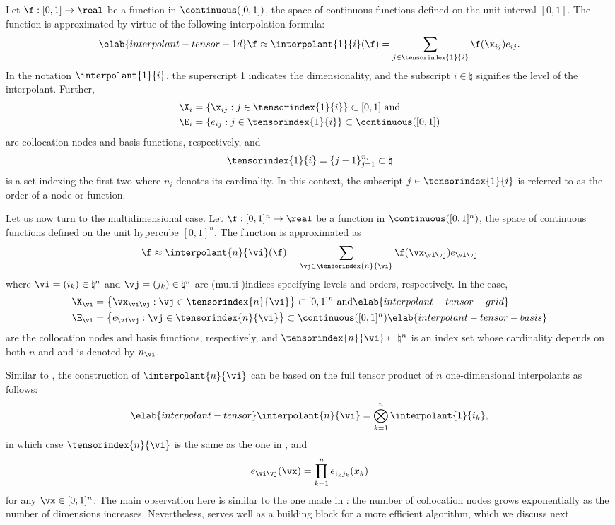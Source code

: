 Let $\f: [0, 1] \to \real$ be a function in $\continuous([0, 1])$, the space of
continuous functions defined on the unit interval $[0, 1]$. The function is
approximated by virtue of the following interpolation formula:
\begin{equation} \elab{interpolant-tensor-1d}
  \f \approx \interpolant{1}{i}(\f)
  = \sum_{j \in \tensorindex{1}{i}} \f(\x_{ij}) e_{ij}.
\end{equation}
In the notation $\interpolant{1}{i}$, the superscript 1 indicates the
dimensionality, and the subscript $i \in \natural$ signifies the level of the
interpolant. Further,
\begin{align*}
  & \X_i = \{ \x_{ij}: j \in \tensorindex{1}{i} \} \subset [0, 1] \text{ and} \\
  & \E_i = \{ e_{ij}: j \in \tensorindex{1}{i} \} \subset \continuous([0, 1])
\end{align*}
are collocation nodes and basis functions, respectively, and
\[
  \tensorindex{1}{i} = \{ j - 1 \}_{j = 1}^{n_i} \subset \natural
\]
is a set indexing the first two where $n_i$ denotes its cardinality. In this
context, the subscript $j \in \tensorindex{1}{i}$ is referred to as the order of
a node or function.

Let us now turn to the multidimensional case. Let $\f: [0, 1]^n \to \real$ be a
function in $\continuous([0, 1]^n)$, the space of continuous functions defined
on the unit hypercube $[0, 1]^n$. The function is approximated as
\[
  \f \approx \interpolant{n}{\vi}(\f)
  = \sum_{\vj \in \tensorindex{n}{\vi}} \f(\vx_{\vi \vj}) e_{\vi \vj}
\]
where $\vi = (i_k) \in \natural^n$ and $\vj = (j_k) \in \natural^n$ are
(multi-)indices specifying levels and orders, respectively. In the case,
\begin{align}
  & \X_{\vi} = \left\{ \vx_{\vi \vj}: \vj \in \tensorindex{n}{\vi} \right\} \subset [0, 1]^n \text{ and} \elab{interpolant-tensor-grid} \\
  & \E_{\vi} = \left\{ e_{\vi \vj}: \vj \in \tensorindex{n}{\vi} \right\} \subset \continuous([0, 1]^n) \elab{interpolant-tensor-basis}
\end{align}
are the collocation nodes and basis functions, respectively, and
$\tensorindex{n}{\vi} \subset \natural^n$ is an index set whose cardinality
depends on both $n$ and \vi and is denoted by $n_{\vi}$.

Similar to , the construction of $\interpolant{n}{\vi}$
can be based on the full tensor product of $n$ one-dimensional interpolants as
follows:
\begin{equation} \elab{interpolant-tensor}
  \interpolant{n}{\vi} = \bigotimes_{k = 1}^n \interpolant{1}{i_k},
\end{equation}
in which case $\tensorindex{n}{\vi}$ is the same as the one in
, and
\[
  e_{\vi \vj}(\vx) = \prod_{k = 1}^n e_{i_k j_k}(x_k)
\]
for any $\vx \in [0, 1]^n$. The main observation here is similar to the one made
in : the number of collocation nodes grows
exponentially as the number of dimensions increases. Nevertheless,
 serves well as a building block for a more efficient
algorithm, which we discuss next.

